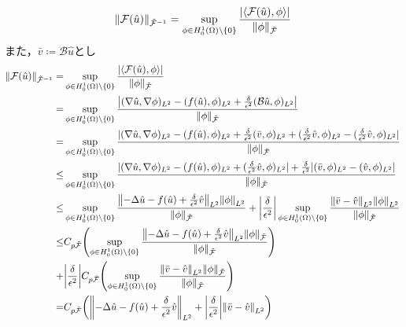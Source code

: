 \begin{align}
    \norm{\mathcal{F}\qty(\hat{u})}_{\tilde{\mathcal{F}}^{-1}}
    = 
    \sup\limits_{\phi \in H^1_0\qty(\Omega) \backslash \{ 0 \} }
    \dfrac{\qty|\langle \mathcal{F}\qty(\hat{u}),\phi \rangle|}{\norm{\phi}_{\tilde{\mathcal{F}}}}
\end{align}
また，\(\bar{v} \coloneqq \mathcal{B}\hat{u}\)とし
\begin{align}
  \norm{\mathcal{F}\qty(\hat{u})}_{\tilde{\mathcal{F}}^{-1}}
  =&
  \sup\limits_{\phi \in H^1_0\qty(\Omega) \backslash \{ 0 \} }
  \dfrac{\qty|\langle \mathcal{F}\qty(\hat{u}),\phi \rangle|}{\norm{\phi}_{\tilde{\mathcal{F}}}}\\
  =&
  \sup\limits_{\phi \in H^1_0\qty(\Omega) \backslash \{ 0 \} }
  \dfrac{\qty|(\nabla \hat{u},\nabla \phi)_{L^2}-(f(\hat{u}),\phi)_{L^2}+\frac{\delta}{\epsilon^2}(\mathcal{B}\hat{u},\phi)_{L^2}|}{\norm{\phi}_{\tilde{\mathcal{F}}}}\\
  =&
  \sup\limits_{\phi \in H^1_0\qty(\Omega) \backslash \{ 0 \} }
  \dfrac{|(\nabla \hat{u},\nabla \phi)_{L^2}-(f(\hat{u}),\phi)_{L^2}
  +\frac{\delta}{\epsilon^2}(\bar{v},\phi)_{L^2}+(\frac{\delta}{\epsilon^2}\hat{v},\phi)_{L^2}-(\frac{\delta}{\epsilon^2}\hat{v},\phi)_{L^2}|}
  {\norm{\phi}_{\tilde{\mathcal{F}}}}\\
  \leq&
  \sup\limits_{\phi \in H^1_0\qty(\Omega) \backslash \{ 0 \} }
  \dfrac{|(\nabla \hat{u},\nabla \phi)_{L^2}-(f(\hat{u}),\phi)_{L^2}+(\frac{\delta}{\epsilon^2}\hat{v},\phi)_{L^2}|
  +\frac{\delta}{\epsilon^2}|(\bar{v},\phi)_{L^2}-(\hat{v},\phi)_{L^2}|}
  {\norm{\phi}_{\tilde{\mathcal{F}}}}\\
  \leq&
  \sup\limits_{\phi \in H^1_0\qty(\Omega) \backslash \{ 0 \} }
  \dfrac{\norm{-\Delta \hat{u}-f(\hat{u})+\frac{\delta}{\epsilon^2}\hat{v}}_{L^2}\norm{\phi}_{L^2}}
  {\norm{\phi}_{\tilde{\mathcal{F}}}}
  +\qty|\frac{\delta}{\epsilon^2}|
  \sup\limits_{\phi \in H^1_0\qty(\Omega) \backslash \{ 0 \} }
  \dfrac{\norm{   \bar{v}-\hat{v}}_{L^2}\norm{\phi}_{L^2}}
  {\norm{\phi}_{\tilde{\mathcal{F}}}}\\
  \leq&
  C_{p\tilde{\mathcal{F}}}\qty(
  \sup\limits_{\phi \in H^1_0\qty(\Omega) \backslash \{ 0 \} }
  \dfrac{\norm{-\Delta \hat{u}-f(\hat{u})+\frac{\delta}{\epsilon^2}\hat{v}}_{L^2}\norm{\phi}_{\tilde{\mathcal{F}}}}
  {\norm{\phi}_{\tilde{\mathcal{F}}}})\\
  +&
  \qty|\frac{\delta}{\epsilon^2}|
  C_{p\tilde{\mathcal{F}}}\qty(
  \sup\limits_{\phi \in H^1_0\qty(\Omega) \backslash \{ 0 \} }
  \dfrac{\norm{   \bar{v}-\hat{v}}_{L^2}\norm{\phi}_{\tilde{\mathcal{F}}}}
  {\norm{\phi}_{\tilde{\mathcal{F}}}}
  )\\
  =&
  C_{p\tilde{\mathcal{F}}}
  \qty(
    \norm{-\Delta \hat{u}-f(\hat{u})+\frac{\delta}{\epsilon^2}\hat{v}}_{L^2}
    +\qty|\frac{\delta}{\epsilon^2}|
    \norm{\bar{v}-\hat{v}}_{L^2}
  )
\end{align}
